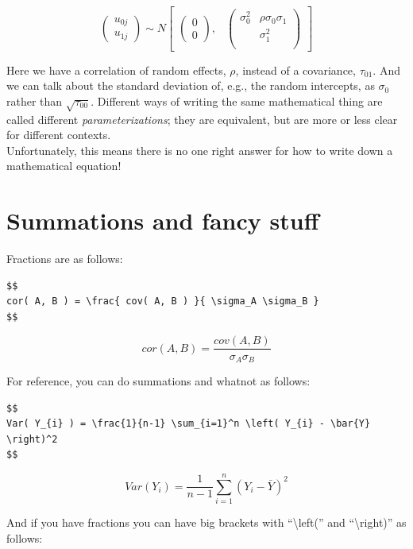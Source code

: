 \documentclass[
  letterpaper,
  DIV=11,
  numbers=noendperiod]{scrreprt}
\begin{document}
\[
\begin{pmatrix} u_{0j} \\
u_{1j}
\end{pmatrix} \sim  N
\begin{bmatrix}
\begin{pmatrix}
0 \\
0
\end{pmatrix}\!\!,&
\begin{pmatrix}
\sigma^2_{0} & \rho \sigma_0 \sigma_1 \\
 & \sigma^2_{1} \\
\end{pmatrix}
\end{bmatrix}
\]

Here we have a correlation of random effects, \(\rho\), instead of a
covariance, \(\tau_{01}\). And we can talk about the standard deviation
of, e.g., the random intercepts, as \(\sigma_0\) rather than
\(\sqrt{ \tau_{00} }\). Different ways of writing the same mathematical
thing are called different \emph{parameterizations}; they are
equivalent, but are more or less clear for different contexts.\\
Unfortunately, this means there is no one right answer for how to write
down a mathematical equation!

\section{Summations and fancy stuff}\label{summations-and-fancy-stuff}

Fractions are as follows:

\begin{verbatim}
$$
cor( A, B ) = \frac{ cov( A, B ) }{ \sigma_A \sigma_B }
$$
\end{verbatim}

\[
cor( A, B ) = \frac{ cov( A, B ) }{ \sigma_A \sigma_B }
\]

For reference, you can do summations and whatnot as follows:

\begin{verbatim}
$$
Var( Y_{i} ) = \frac{1}{n-1} \sum_{i=1}^n \left( Y_{i} - \bar{Y} \right)^2 
$$
\end{verbatim}

\[
Var( Y_{i} ) = \frac{1}{n-1} \sum_{i=1}^n \left( Y_{i} - \bar{Y} \right)^2 
\]

And if you have fractions you can have big brackets with
``\textbackslash left('' and ``\textbackslash right)'' as follows:
\end{document}
